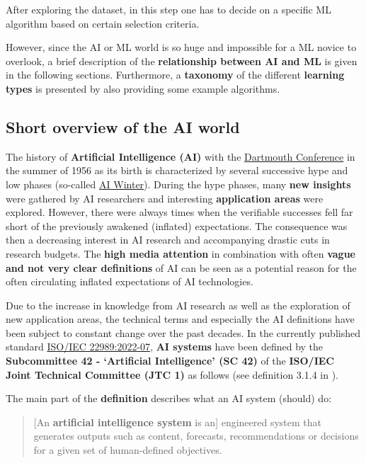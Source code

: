 \documentclass [oneside,10pt,a4paper,ngerman,BCOR10mm,headsepline,parindent,final]{scrartcl}
\begin{document}
After exploring the dataset, in this step one has to decide on a
specific ML algorithm based on certain selection criteria.

However, since the AI or ML world is so huge and impossible for a ML
novice to overlook, a brief description of the \textbf{relationship
between AI and ML} is given in the following sections. Furthermore, a
\textbf{taxonomy} of the different \textbf{learning types} is presented
by also providing some example algorithms.

\hypertarget{short-overview-of-the-ai-world}{%
\subsection{Short overview of the AI
world}\label{short-overview-of-the-ai-world}}

The history of \textbf{Artificial Intelligence (AI)} with the
\href{https://en.wikipedia.org/wiki/Dartmouth_workshop}{Dartmouth
Conference} in the summer of 1956 as its birth is characterized by
several successive hype and low phases (so-called
\href{https://de.wikipedia.org/wiki/KI-Winter}{AI Winter}). During the
hype phases, many \textbf{new insights} were gathered by AI researchers
and interesting \textbf{application areas} were explored. However, there
were always times when the verifiable successes fell far short of the
previously awakened (inflated) expectations. The consequence was then a
decreasing interest in AI research and accompanying drastic cuts in
research budgets. The \textbf{high media attention} in combination with
often \textbf{vague and not very clear definitions} of AI can be seen as
a potential reason for the often circulating inflated expectations of AI
technologies.

Due to the increase in knowledge from AI research as well as the
exploration of new application areas, the technical terms and especially
the AI definitions have been subject to constant change over the past
decades. In the currently published standard
\href{https://webstore.iec.ch/publication/77839}{ISO/IEC 22989:2022-07},
\textbf{AI systems} have been defined by the \textbf{Subcommittee 42 -
`Artificial Intelligence' (SC 42)} of the \textbf{ISO/IEC Joint
Technical Committee (JTC 1)} as follows (see definition 3.1.4 in
\cite{ISO_IEC_22989_2022-07}).

The main part of the \textbf{definition} describes what an AI system
(should) do:

\begin{quote}
{[}An \textbf{artificial intelligence system} is an{]} engineered system
that generates outputs such as content, forecasts, recommendations or
decisions for a given set of human-defined objectives.
\end{quote}
\end{document}
